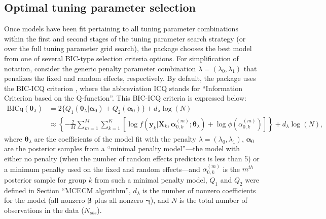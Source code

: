 \subsection{Optimal tuning parameter selection}
\label{sec:BIC-discussion}
Once models have been fit pertaining to all tuning parameter combinations
within the first and second stages of the tuning parameter search strategy (or over the full tuning parameter grid search), the  package chooses the best model from one of several BIC-type selection criteria options. For simplification of notation, consider the generic penalty parameter combination $\lambda = (\lambda_0,\lambda_1)$ that penalizes the fixed and random effects, respectively. By default, the package uses the BIC-ICQ criterion \citep{BICq2011}, where the abbreviation ICQ stands for ``Information Criterion based on the Q-function''. This BIC-ICQ criteria is expressed below:
\begin{equation}
    \begin{aligned}
    \text{BICq}(\boldsymbol \theta_\lambda) &= 2 \{ Q_1(\boldsymbol \theta_\lambda | \boldsymbol \alpha_0) + Q_2(\boldsymbol \alpha_0)\} + d_\lambda  \log(N) \\
    &\approx \left \{-\frac{2}{M} \sum_{m=1}^M \sum_{k=1}^K \left [ \log f(\boldsymbol y_k | \boldsymbol X_k, \boldsymbol \alpha_{0,k}^{(m)}; \boldsymbol \theta_\lambda) + \log \phi (\alpha_{0,k}^{(m)}) \right ] \right \}  
    + d_\lambda  \log(N),
\end{aligned}
\end{equation}
where $\boldsymbol \theta_\lambda$ are the coefficients of the model fit with the penalty $\lambda = (\lambda_0, \lambda_1)$, $\boldsymbol \alpha_0$ are the posterior samples from a ``minimal penalty model''---the model with either no penalty (when the number of random effects predictors is less than 5) or a minimum penalty used on the fixed and random effects---and $\alpha_{0,k}^{(m)}$ is the $m^{th}$ posterior sample for group $k$ from such a minimal penalty model, $Q_1$ and $Q_2$ were defined in Section ``MCECM algorithm'', \(d_\lambda\) is the number of nonzero coefficients for the model (all nonzero \(\boldsymbol \beta\) plus all nonzero \(\boldsymbol \gamma\)), and \(N\) is the total number of observations in the data (\(N_{obs}\)).


